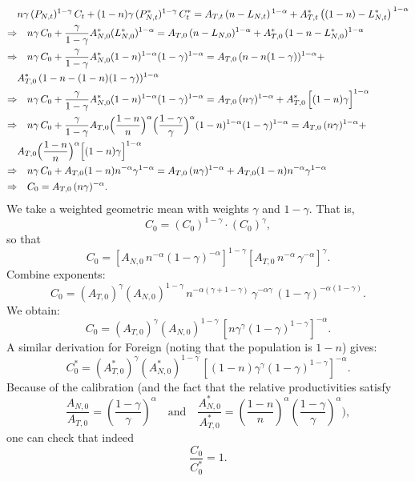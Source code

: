\documentclass[a4paper,12pt]{article} %
\theoremstyle{nonitalic}
\begin{document}
\begin{align*}
    & n\gamma\,(P_{N,t})^{1-\gamma}\,C_t + (1-n)\gamma\,(P^*_{N,t})^{1-\gamma}\,C^*_t = A_{T,t}\,(n-L_{N,t})^{\,1-\alpha} + A^*_{T,t}\,\big((1-n)-L^*_{N,t}\big)^{\,1-\alpha} \\
    \Rightarrow & \quad n\gamma\,C_0 + \frac{\gamma}{1-\gamma} A_{N,0}^*(L_{N,0}^*)^{1-\alpha} = A_{T,0}\,(n - L_{N,0})^{1-\alpha} + A^*_{T,0}\,(1-n - L_{N,0}^*)^{1-\alpha} \\
    \Rightarrow & \quad n\gamma\,C_0 + \frac{\gamma}{1-\gamma} A_{N,0}^*(1-n)^{1-\alpha} (1-\gamma)^{1-\alpha} = A_{T,0}\,(n - n(1-\gamma))^{1-\alpha} + \\
    & A^*_{T,0}\,(1-n - (1-n)(1-\gamma))^{1-\alpha} \\
    \Rightarrow & \quad n\gamma\,C_0 + \frac{\gamma}{1-\gamma} A_{N,0}^*(1-n)^{1-\alpha} (1-\gamma)^{1-\alpha} = A_{T,0}\,(n\gamma)^{1-\alpha} + A^*_{T,0}\,\Bigl[(1-n)\gamma\Bigr]^{1-\alpha} \\
    \Rightarrow & \quad n\gamma\,C_0 + \frac{\gamma}{1-\gamma} A_{T,0} \Bigl(\frac{1-n}{n}\Bigr)^{\alpha} \Bigl(\frac{1-\gamma}{\gamma}\Bigr)^{\alpha} (1-n)^{1-\alpha} (1-\gamma)^{1-\alpha} = A_{T,0}\,(n\gamma)^{1-\alpha} + \\
    & A_{T,0} \Bigl(\frac{1-n}{n}\Bigr)^{\alpha} \Bigl[(1-n)\gamma\Bigr]^{1-\alpha} \\
    \Rightarrow & \quad n\gamma\,C_0 + A_{T,0}(1-n) n^{-\alpha} \gamma^{1-\alpha} = A_{T,0}\,(n\gamma)^{1-\alpha} + A_{T,0} (1-n) n^{-\alpha} \gamma^{1-\alpha} \\
    \Rightarrow & \quad C_0 = A_{T,0}\,(n\gamma)^{-\alpha}.
\end{align*}
We take a weighted geometric mean with weights $\gamma$ and $1-\gamma$. That is,
\[
C_0 = (C_{0})^{1-\gamma} \cdot (C_{0})^{\gamma},
\]
so that
\[
C_0 = \left[A_{N,0}\, n^{-\alpha}(1-\gamma)^{-\alpha}\right]^{1-\gamma}
\left[A_{T,0}\, n^{-\alpha}\,\gamma^{-\alpha}\right]^{\gamma}.
\]
Combine exponents:
\[
C_0 = (A_{T,0})^{\gamma}(A_{N,0})^{1-\gamma}\, n^{-\alpha(\gamma+1-\gamma)}\,\gamma^{-\alpha\gamma}\,(1-\gamma)^{-\alpha(1-\gamma)}.
\]
We obtain:
\[
\boxed{
C_0 = (A_{T,0})^{\gamma}(A_{N,0})^{1-\gamma}\, \left[n \gamma^{\gamma}(1-\gamma)^{1-\gamma}\right]^{-\alpha}.
}
\]
A similar derivation for Foreign (noting that the population is $1-n$) gives:
\[
\boxed{
C^*_0 = (A^*_{T,0})^{\gamma}(A^*_{N,0})^{1-\gamma}\,\left[(1-n)\gamma^{\gamma}(1-\gamma)^{1-\gamma}\right]^{-\alpha}.
}
\]
Because of the calibration (and the fact that the relative productivities satisfy
\[
\frac{A_{N,0}}{A_{T,0}} = \left(\frac{1-\gamma}{\gamma}\right)^{\alpha} \quad \text{and} \quad \frac{A^*_{N,0}}{A^*_{T,0}} = \left(\frac{1-n}{n}\right)^{\alpha}\left(\frac{1-\gamma}{\gamma}\right)^{\alpha}),
\]
one can check that indeed
\[
\frac{C_0}{C^*_0}=1.
\]
\end{document}
